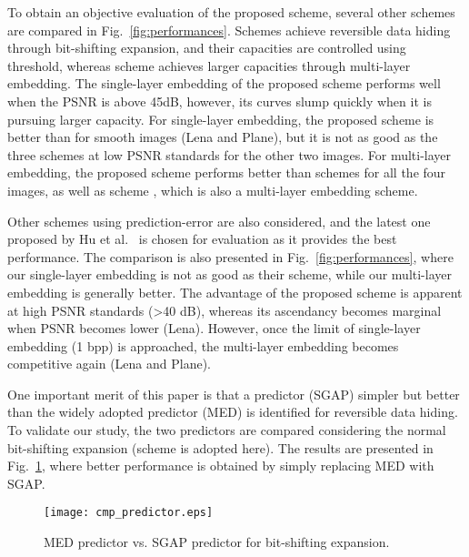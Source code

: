 \documentclass{sig-alternate}
\begin{document}
To obtain an objective evaluation of the proposed scheme, several other schemes are compared in
Fig.\ \ref{fig:performances}. Schemes \cite{Kim08ifs,Lin08,Kim08hist} achieve reversible data hiding
through bit-shifting expansion, and their capacities are controlled using threshold, whereas scheme
\cite{Lin08tp} achieves larger capacities through multi-layer embedding. The single-layer embedding
of the proposed scheme performs well when the PSNR is above 45dB, however, its curves slump quickly
when it is pursuing larger capacity. For single-layer embedding, the proposed scheme is better than
\cite{Kim08ifs,Lin08,Kim08hist} for smooth images (Lena and Plane), but it is not as good as the
three schemes at low PSNR standards for the other two images. For multi-layer embedding, the
proposed scheme performs better than schemes \cite{Kim08ifs,Lin08,Kim08hist} for all the four
images, as well as scheme \cite{Lin08tp}, which is also a multi-layer embedding scheme.

Other schemes using prediction-error \cite{Thodi07pee,Kuribayashi08,Hu2009} are also considered, and
the latest one proposed by Hu et al.\ \cite{Hu2009} is chosen for evaluation as it provides the best
performance. The comparison is also presented in Fig.\ \ref{fig:performances}, where our
single-layer embedding is not as good as their scheme, while our multi-layer embedding is generally
better. The advantage of the proposed scheme is apparent at high PSNR standards (>40 dB), whereas
its ascendancy becomes marginal when PSNR becomes lower (Lena). However, once the limit of
single-layer embedding (1 bpp) is approached, the multi-layer embedding becomes competitive again
(Lena and Plane).

One important merit of this paper is that a predictor (SGAP) simpler but better than the widely
adopted predictor (MED) is identified for reversible data hiding. To validate our study, the two
predictors are compared considering the normal bit-shifting expansion (scheme \cite{Hu2009} is
adopted here). The results are presented in Fig.\ \ref{fig:medsgap}, where better performance is
obtained by simply replacing MED with SGAP.

\begin{figure}[t]
    \centering
    \texttt{[image: cmp\_predictor.eps]}
    \caption{\label{fig:medsgap}MED predictor vs. SGAP predictor for bit-shifting expansion.}
\end{figure}
\end{document}
